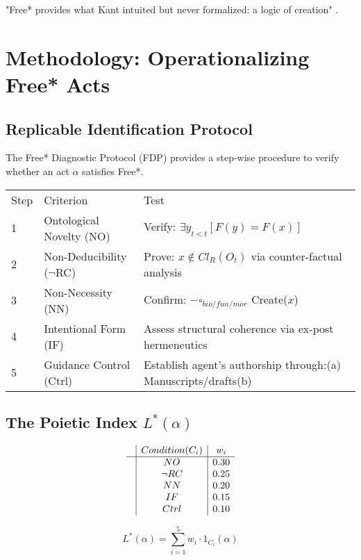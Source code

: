 \documentclass[11pt,a4paper]{article}
\begin{document}
"Free* provides what Kant intuited but never formalized: a logic of creation" \cite[ p. 88]{shapiro2024}.

\section{Methodology: Operationalizing Free* Acts}\label{sec:methods}

\subsection{Replicable Identification Protocol}\label{sec:methods-fdp}

The Free* Diagnostic Protocol (FDP) provides a step-wise procedure to verify whether an act \(\alpha\) satisfies Free*.

\begin{tabular}{l l l}
Step & Criterion & Test \\
1 & Ontological Novelty (NO) & Verify: \(\exists y_{t<t} [F(y) = F(x)]\) \\
2 & Non-Deducibility (\(\neg\)RC) & Prove: \(x \notin Cl_R(O_t)\) via counter-factual analysis \\
3 & Non-Necessity (NN) & Confirm: \(-\square_{bio/fun/mor}\) Create(\(x\)) \\
4 & Intentional Form (IF) & Assess structural coherence via ex-post hermeneutics \\
5 & Guidance Control (Ctrl) & Establish agent's authorship through:(a) Manuscripts/drafts(b) \\
\end{tabular}

\subsection{The Poietic Index \(L^*(\alpha)\)}\label{sec:methods-lstar}

\[
\begin{array}{c|c|c}
& Condition (C_i) & w_i \\
\hline
& NO & 0.30 \\
& \neg RC & 0.25 \\
& NN & 0.20 \\
& IF & 0.15 \\
& Ctrl & 0.10 \\
\end{array}
\]

\[
L^*(\alpha) = \sum_{i=1}^{5} w_i \cdot 1_{C_i}(\alpha)
\]
\end{document}

